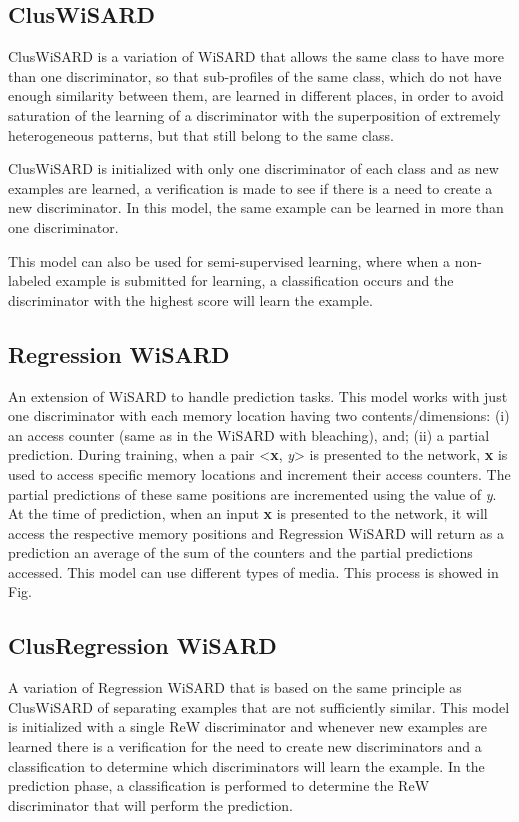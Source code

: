 \documentclass[12pt]{article}
\begin{document}
\subsection{ClusWiSARD}

ClusWiSARD\cite{douglas} is a variation of WiSARD that allows the same class to have more than one discriminator, so that sub-profiles of the same class, which do not have enough similarity between them, are learned in different places, in order to avoid saturation of the learning of a discriminator with the superposition of extremely heterogeneous patterns, but that still belong to the same class.

ClusWiSARD is initialized with only one discriminator of each class and as new examples are learned, a verification is made to see if there is a need to create a new discriminator. In this model, the same example can be learned in more than one discriminator.

This model can also be used for semi-supervised learning, where when a non-labeled example is submitted for learning, a classification occurs and the discriminator with the highest score will learn the example.

\subsection{Regression WiSARD}

An extension of WiSARD to handle prediction tasks. This model works with just one discriminator with each memory location having two contents/dimensions: (i) an access counter (same as in the WiSARD with bleaching), and; (ii) a partial prediction. During training, when a pair <\textbf{x}, \textit{y}> is presented to the network, \textbf{x} is used to access specific memory locations and increment their access counters. The partial predictions of these same positions are incremented using the value of \textit{y}. At the time of prediction, when an input \textbf{x} is presented to the network, it will access the respective memory positions and Regression WiSARD will return as a prediction an average of the sum of the counters and the partial predictions accessed. This model can use different types of media. This process is showed in Fig.


\subsection{ClusRegression WiSARD}

A variation of Regression WiSARD that is based on the same principle as ClusWiSARD of separating examples that are not sufficiently similar\cite{rew, lusquino2020}. This model is initialized with a single ReW discriminator and whenever new examples are learned there is a verification for the need to create new discriminators and a classification to determine which discriminators will learn the example. In the prediction phase, a classification is performed to determine the ReW discriminator that will perform the prediction.
\end{document}
